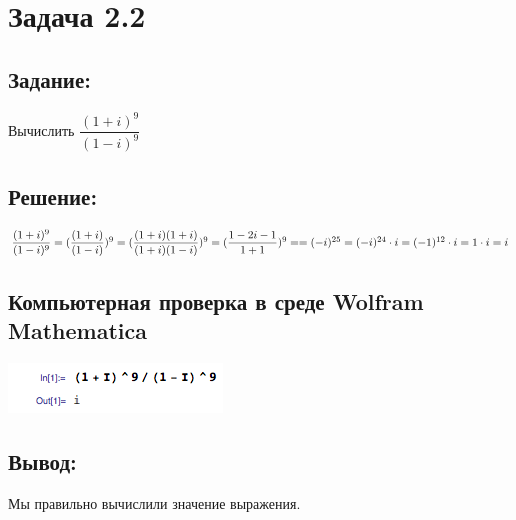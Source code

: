\section{Задача 2.2}
\subsection{Задание:}
Вычислить
$
	\dfrac{(1+i)^9}{(1-i)^9}
$
\subsection{Решение:}
$
	\dfrac{(1+i)^9}{(1-i)^9}
	=
	(\dfrac{(1+i)}{(1-i)})^9
	=
	(\dfrac{(1+i)(1+i)}{(1+i)(1-i)})^9
	=
	(\dfrac{1 - 2i - 1}{1 + 1})^9
	=
	\\[1em]
	=
	(-i)^{25}
	=
	(-i)^{24} \cdot i
	=
	(-1)^{12} \cdot i
	=
	1 \cdot i
	=
	i
$
\subsection{Компьютерная проверка в среде Wolfram Mathematica}
\includegraphics[scale=0.6]{task/2_02/screen1.png}
\subsection{Вывод:}
Мы правильно вычислили значение выражения.
